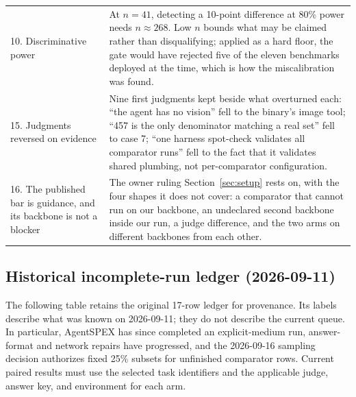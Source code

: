 \begin{table}[t]
\begin{tabular}{@{}p{3.3cm}p{9.9cm}@{}}
10. Discriminative power &
At $n=41$, detecting a 10-point difference at 80\% power needs $n\approx268$. Low $n$ bounds what
may be claimed rather than disqualifying; applied as a hard floor, the gate would have rejected five
of the eleven benchmarks deployed at the time, which is how the miscalibration was found. \\
15. Judgments reversed on evidence &
Nine first judgments kept beside what overturned each: ``the agent has no vision'' fell to the
binary's image tool; ``457 is the only denominator matching a real set'' fell to case 7; ``one
harness spot-check validates all comparator runs'' fell to the fact that it validates shared
plumbing, not per-comparator configuration. \\
16. The published bar is guidance, and its backbone is not a blocker &
The owner ruling Section~\ref{sec:setup} rests on, with the four shapes it does not cover: a
comparator that cannot run on our backbone, an undeclared second backbone inside our run, a judge
difference, and the two arms on different backbones from each other. \\
\bottomrule
\end{tabular}
\end{table}



\subsection{Historical incomplete-run ledger (2026-09-11)}
\label{sec:pending}

The following table retains the original 17-row ledger for provenance. Its labels describe
what was known on 2026-09-11; they do not describe the current queue. In particular, AgentSPEX
has since completed an explicit-medium run, answer-format and network repairs have progressed,
and the 2026-09-16 sampling decision authorizes fixed 25\% subsets for unfinished comparator
rows. Current paired results must use the selected task identifiers and the applicable judge,
answer key, and environment for each arm.

